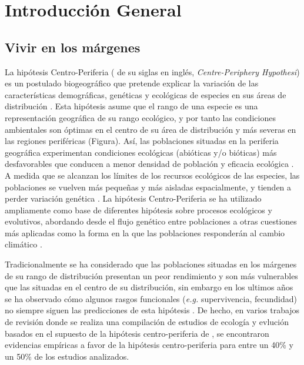 %

\chapter{\textcolor{ctcolormain}{Introducción General}}\label{sec:intro}
\newpage

\section{Vivir en los márgenes}\label{sec:intro:rear-edge}

La hipótesis Centro-Periferia ( de su siglas en inglés, \textit{Centre-Periphery Hypothesi}) es un postulado biogeográfico que pretende explicar la variación de las características demográficas, genéticas y ecológicas de especies en sus áreas de distribución \autocite{Sextonetal2009EvolutionEcology, Pirononetal2015GeographicClimatic}. Esta hipótesis asume que el rango de una especie es una representación geográfica de su rango ecológico, y por tanto las condiciones ambientales son óptimas en el centro de su área de distribución y más severas en las regiones periféricas \autocite{Pirononetal2017GeographicVariation}(Figura). Así, las poblaciones situadas en la periferia geográfica experimentan condiciones ecológicas (abióticas y/o bióticas) más desfavorables que conducen a menor densidad de población y eficacia ecológica \autocite[\textit{fitness},][]{Brown1984RelationshipAbundance}. A medida que se alcanzan los límites de los recursos ecológicos de las especies, las poblaciones se vuelven más pequeñas y más aisladas espacialmente, y tienden a perder variación genética \autocites[][]{Karketal2008HowDoes,Garciaetal2010LivingEdge}. La hipótesis Centro-Periferia se ha utilizado ampliamente como base de diferentes hipótesis sobre procesos ecológicos y evolutivos, abordando desde el flujo genético entre poblaciones a otras cuestiones más aplicadas como la forma en la que las poblaciones responderán al cambio climático \autocites{SagarinGaines2002AbundantCentre}. 

Tradicionalmente se ha considerado que las poblaciones situadas en los márgenes de su rango de distribución presentan un peor rendimiento y son más vulnerables que las situadas en el centro de su distribución, sin embargo en los ultimos años se ha observado cómo algunos rasgos funcionales (\emph{e.g.} supervivencia, fecundidad) no siempre siguen las predicciones de esta hipótesis \autocite{Pirononetal2017GeographicVariation}. De hecho, en varios trabajos de revisión donde se realiza una compilación de estudios de ecología y evlución basados en el supuesto de la hipótesis centro-periferia de \autocites{SagarinGaines2002AbundantCentre,Pirononetal2017GeographicVariation}, se encontraron evidencias empíricas a favor de la hipótesis centro-periferia para entre un 40\% y un 50\% de los estudios analizados. 

